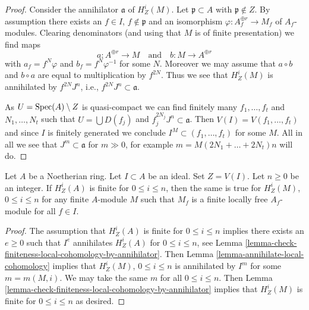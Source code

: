 \begin{proof}
Consider the annihilator $\mathfrak a$ of $H^i_Z(M)$.
Let $\mathfrak p \subset A$ with $\mathfrak p \not \in Z$.
By assumption there exists an $f \in I$, $f \not \in \mathfrak p$
and an isomorphism $\varphi : A_f^{\oplus r} \to M_f$
of $A_f$-modules. Clearing denominators (and using that
$M$ is of finite presentation) we find maps
$$
a : A^{\oplus r} \longrightarrow M
\quad\text{and}\quad
b : M \longrightarrow A^{\oplus r}
$$
with $a_f = f^N \varphi$ and $b_f = f^N \varphi^{-1}$ for some $N$.
Moreover we may assume that $a \circ b$ and $b \circ a$ are equal to
multiplication by $f^{2N}$. Thus we see that $H^i_Z(M)$ is annihilated by
$f^{2N}J^n$, i.e., $f^{2N}J^n \subset \mathfrak a$.

\medskip\noindent
As $U = \mathop{\mathrm{Spec}}(A) \setminus Z$ is quasi-compact we can find finitely many
$f_1, \ldots, f_t$ and $N_1, \ldots, N_t$ such that $U = \bigcup D(f_j)$ and
$f_j^{2N_j}J^n \subset \mathfrak a$. Then $V(I) = V(f_1, \ldots, f_t)$
and since $I$ is finitely generated we conclude
$I^M \subset (f_1, \ldots, f_t)$ for some $M$.
All in all we see that $J^m \subset \mathfrak a$ for
$m \gg 0$, for example $m = M (2N_1 + \ldots + 2N_t) n$ will do.
\end{proof}

\begin{lemma}
\label{lemma-local-finiteness-for-finite-locally-free}
Let $A$ be a Noetherian ring. Let $I \subset A$ be an ideal. Set $Z = V(I)$.
Let $n \geq 0$ be an integer. If $H^i_Z(A)$ is finite for $0 \leq i \leq n$,
then the same is true for $H^i_Z(M)$, $0 \leq i \leq n$ for
any finite $A$-module $M$ such that $M_f$ is a finite locally free
$A_f$-module for all $f \in I$.
\end{lemma}

\begin{proof}
The assumption that $H^i_Z(A)$ is finite for $0 \leq i \leq n$
implies there exists an $e \geq 0$ such that $I^e$ annihilates
$H^i_Z(A)$ for $0 \leq i \leq n$, see
Lemma \ref{lemma-check-finiteness-local-cohomology-by-annihilator}.
Then Lemma \ref{lemma-annihilate-local-cohomology}
implies that $H^i_Z(M)$, $0 \leq i \leq n$ is annihilated
by $I^m$ for some $m = m(M, i)$. We may take the same $m$
for all $0 \leq i \leq n$. Then
Lemma \ref{lemma-check-finiteness-local-cohomology-by-annihilator}
implies that $H^i_Z(M)$ is finite for $0 \leq i \leq n$
as desired.
\end{proof}





